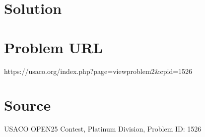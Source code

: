 \documentclass[12pt]{article}
\begin{document}
\section*{Solution}


\section*{Problem URL}
https://usaco.org/index.php?page=viewproblem2&cpid=1526

\section*{Source}
USACO OPEN25 Contest, Platinum Division, Problem ID: 1526
\end{document}
